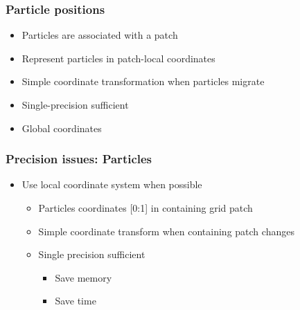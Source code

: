 \begin{frame}[fragile] \frametitle{Particle positions}
      \begin{itemize}
        \item Particles are associated with a patch
        \item Represent particles in patch-local coordinates
        \item Simple coordinate transformation when particles migrate
        \item Single-precision sufficient
        \item Global coordinates
      \end{itemize}
\end{frame}
    \begin{frame}[fragile] \frametitle{Precision issues: Particles}
      \begin{itemize}
        \item Use local coordinate system when possible
        \begin{itemize}
          \item Particles coordinates [0:1] in containing grid patch
          \item Simple coordinate transform when containing patch changes
          \item Single precision sufficient
          \begin{itemize}
            \item Save memory
            \item Save time
          \end{itemize}
        \end{itemize}
      \end{itemize}
\end{frame}
